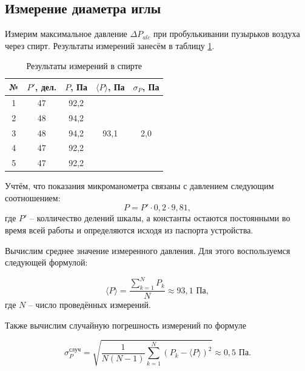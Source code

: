 \documentclass[a4paper,12pt]{article} %
\begin{document}
\subsection{Измерение диаметра иглы}

Измерим максимальное давление $ \Delta P_{alc} $  при  пробулькивании пузырьков воздуха через спирт. Результаты измерений занесём в таблицу \ref{tab:alcohol}.

\begin{table}[H]
	\centering
	\begin{tabular}{|c|c|c|c|c|}
		\hline
		№ & $ P' $, дел. &  $ P $, Па  & $ \langle P \rangle $, Па   & $ \sigma_{P} $, Па             \\ \hline
		1 & 47  & 92,2 & \multirow{5}{*}{93,1} & \multirow{5}{*}{2,0} \\ \cline{1-3}
		2 & 48  & 94,2 &                       &                      \\ \cline{1-3}
		3 & 48  & 94,2 &                       &                      \\ \cline{1-3}
		4 & 47  & 92,2 &                       &                      \\ \cline{1-3}
		5 & 47  & 92,2 &                       &                      \\ \hline
	\end{tabular}
	\caption{Результаты измерений в спирте}
	\label{tab:alcohol}
\end{table}

Учтём, что показания микроманометра связаны с давлением следующим соотношением: \[ P=P' \cdot 0,2 \cdot 9,81, \] где $ P' $ -- колличество делений шкалы, а константы остаются постоянными во время всей работы и определяются исходя из паспорта устройства.

Вычислим среднее значение измеренного давления. Для этого воспользуемся следующей формулой:

\begin{equation}\label{mid}
\langle P \rangle = \frac{\sum\limits_{k=1}^{N} P_k}{N} \approx 93,1 \text{ Па},
\end{equation}
где $ N $ -- число проведённых измерений.

Также вычислим случайную погрешность измерений по формуле

\begin{equation}\label{occasion}
\sigma_{P}^{\text{случ}} = \sqrt{\frac{1}{N(N-1)}\sum\limits_{k=1}^N\left(P_k-\langle P \rangle\right)^2} \approx 0,5 \text{ Па}.
\end{equation}
\end{document}
